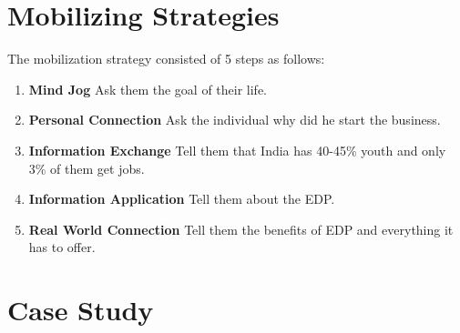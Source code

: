 


\section{Mobilizing Strategies}
The mobilization strategy consisted of 5 steps as follows:
\begin{enumerate}
	\item \textbf{Mind Jog} \newline
		Ask them the goal of their life.
	\item \textbf{Personal Connection} \newline
		Ask the individual why did he start the business.
	\item \textbf{Information Exchange} \newline
		Tell them that India has 40-45\% youth and only 3\% of them get jobs. 
	\item \textbf{Information Application} \newline
		Tell them about the EDP.
	\item \textbf{Real World Connection} \newline
		Tell them the benefits of EDP and everything it has to offer.
\end{enumerate}




\section{Case Study}

